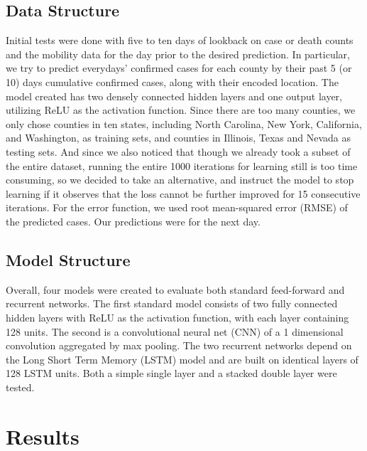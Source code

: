 ﻿\documentclass{article}
\begin{document}
\begin{multicols}{2}
\subsection*{Data Structure}

Initial tests were done with five to ten days of lookback on case or death
counts and the mobility data for the day prior to the desired prediction. In
particular, we try to predict everydays’ confirmed cases for each county by
their past 5 (or 10) days cumulative confirmed cases, along with their encoded
location. The model created has two densely connected hidden layers and one
output layer, utilizing ReLU as the activation function. Since there are too
many counties, we only chose counties in ten states, including North Carolina,
New York, California, and Washington, as training sets, and counties in
Illinois, Texas and Nevada as testing sets. And since we also noticed that
though we already took a subset of the entire dataset, running the entire 1000
iterations for learning still is too time consuming, so we decided to take an
alternative, and instruct the model to stop learning if it observes that the
loss cannot be further improved for 15 consecutive iterations. For the error
function, we used root mean-squared error (RMSE) of the predicted cases. Our
predictions were for the next day.

\subsection*{Model Structure}

Overall, four models were created to evaluate both standard feed-forward
and recurrent networks.
The first standard model consists of two fully connected hidden layers with ReLU
as the activation function, with each layer containing 128 units.
The second is a convolutional neural net (CNN) of a 1 dimensional convolution
aggregated by max pooling.
The two recurrent networks depend on the Long Short Term Memory (LSTM) model and
are built on identical layers of 128 LSTM units.
Both a simple single layer and a stacked double layer were tested.

\end{multicols}

\section*{Results}
\end{document}
